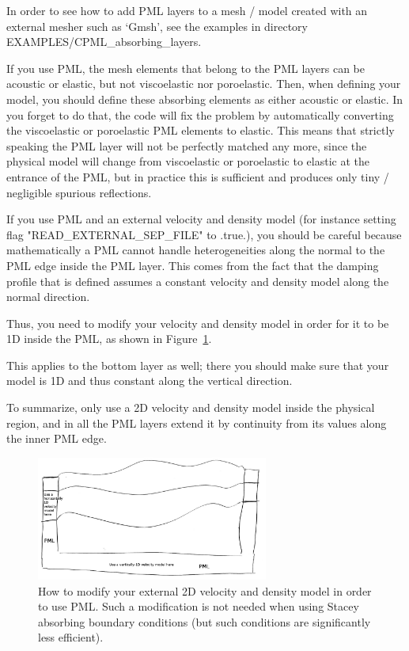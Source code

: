 \documentclass[oneside,english,onecolumn,letterpaper]{book}
\begin{document}
In order to see how to add PML layers to a mesh / model created with an external mesher such as `Gmsh', see the examples in directory
EXAMPLES/CPML\_absorbing\_layers.

If you use PML, the mesh elements that belong to the PML layers can be acoustic or elastic, but not viscoelastic nor poroelastic.
Then, when defining your model, you should define these absorbing elements as either acoustic or elastic.
In you forget to do that, the code will fix the problem by automatically converting the viscoelastic or poroelastic PML
elements to elastic. This means that strictly speaking the PML layer will not be perfectly matched any more, since the physical
model will change from viscoelastic or poroelastic to elastic at the entrance of the PML, but in practice this is sufficient and
produces only tiny / negligible spurious reflections.

If you use PML and an external velocity and density model (for instance setting flag "READ\_EXTERNAL\_SEP\_FILE" to .true.),
you should be careful because mathematically a PML cannot handle heterogeneities along the
normal to the PML edge inside the PML layer. This comes from the fact that the damping profile
that is defined assumes a constant velocity and density model along the normal
direction.

Thus, you need to modify your velocity and density model in order for it to be 1D inside
the PML, as shown in Figure~\ref{fig:modify_external_velocity_model_to_use_PML}.

This applies to the bottom layer as well; there you should make sure
that your model is 1D and thus constant along the vertical direction.

To summarize, only use a 2D velocity and density model inside the physical region, and in
all the PML layers extend it by continuity from its values along the
inner PML edge.

\begin{figure}[htbp]
\noindent \begin{centering}
\includegraphics[width=3in]{figures/how_to_use_PML_when_READ_EXTERNAL_SEP_FILE_is_true.png}
\par\end{centering}
\caption{How to modify your external 2D velocity and density model in order to use PML.
Such a modification is not needed when using Stacey absorbing boundary conditions (but such conditions
are significantly less efficient).}
\label{fig:modify_external_velocity_model_to_use_PML}
\end{figure}
\end{document}
